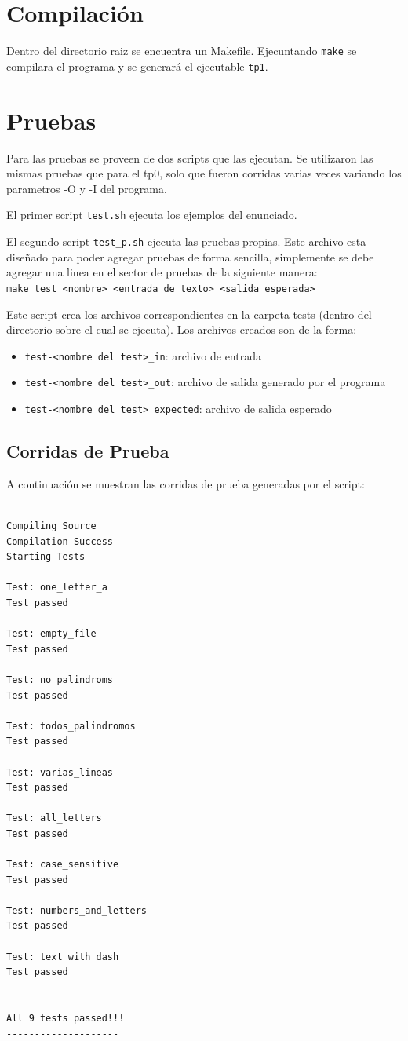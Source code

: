 \documentclass[11pt,a4paper]{article}
\begin{document}
\section{Compilación}
Dentro del directorio raiz se encuentra un Makefile. Ejecuntando \texttt{make} se compilara el programa y se generará el ejecutable \texttt{tp1}.

\section{Pruebas}
Para las pruebas se proveen de dos scripts que las ejecutan.
Se utilizaron las mismas pruebas que para el tp0, solo que fueron corridas varias veces variando los parametros -O y -I del programa.

El primer script \texttt{test.sh} ejecuta los ejemplos del enunciado.

El segundo script \texttt{test\_p.sh} ejecuta las pruebas propias.
Este archivo esta diseñado para poder agregar pruebas de forma sencilla, simplemente se debe agregar una linea en el sector de pruebas de la siguiente manera:\\

\texttt{make\_test <nombre> <entrada de texto> <salida esperada>}

Este script crea los archivos correspondientes en la carpeta tests (dentro del directorio sobre el cual se ejecuta).
Los archivos creados son de la forma:

\begin{itemize}
	\item \texttt{test-<nombre del test>\_in}: archivo de entrada
	\item \texttt{test-<nombre del test>\_out}: archivo de salida generado por el programa
	\item \texttt{test-<nombre del test>\_expected}: archivo de salida esperado
\end{itemize}

\subsection{Corridas de Prueba}
A continuación se muestran las corridas de prueba generadas por el script:

\begin{lstlisting}

Compiling Source
Compilation Success
Starting Tests

Test: one_letter_a
Test passed

Test: empty_file
Test passed

Test: no_palindroms
Test passed

Test: todos_palindromos
Test passed

Test: varias_lineas
Test passed

Test: all_letters
Test passed

Test: case_sensitive
Test passed

Test: numbers_and_letters
Test passed

Test: text_with_dash
Test passed

--------------------
All 9 tests passed!!!
--------------------
\end{lstlisting}
\end{document}
